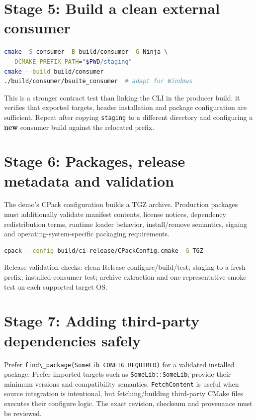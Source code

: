 \documentclass[11pt,letterpaper,oneside]{report}
\providecommand{\passthrough}[1]{#1}
\begin{document}
\chapter{Stage 5: Build a clean external
consumer}\label{stage-5-build-a-clean-external-consumer}

\begin{lstlisting}[language=sh]
cmake -S consumer -B build/consumer -G Ninja \
  -DCMAKE_PREFIX_PATH="$PWD/staging"
cmake --build build/consumer
./build/consumer/bsuite_consumer  # adapt for Windows
\end{lstlisting}

This is a stronger contract test than linking the CLI in the producer
build: it verifies that exported targets, header installation and
package configuration are sufficient. Repeat after copying
\passthrough{\lstinline!staging!} to a different directory and
configuring a \textbf{new} consumer build against the relocated prefix.

\chapter{Stage 6: Packages, release metadata and
validation}\label{stage-6-packages-release-metadata-and-validation}

The demo's CPack configuration builds a TGZ archive. Production packages
must additionally validate manifest contents, license notices,
dependency redistribution terms, runtime loader behavior, install/remove
semantics, signing and operating-system-specific packaging requirements.

\begin{lstlisting}[language=sh]
cpack --config build/ci-release/CPackConfig.cmake -G TGZ
\end{lstlisting}

Release validation checks: clean Release configure/build/test; staging
to a fresh prefix; installed-consumer test; archive extraction and one
representative smoke test on each supported target OS.

\chapter{Stage 7: Adding third-party dependencies
safely}\label{stage-7-adding-third-party-dependencies-safely}

Prefer \passthrough{\lstinline!find\_package(SomeLib CONFIG REQUIRED)!}
for a validated installed package. Prefer imported targets such as
\passthrough{\lstinline!SomeLib::SomeLib!}; provide their minimum
versions and compatibility semantics.
\passthrough{\lstinline!FetchContent!} is useful when source integration
is intentional, but fetching/building third-party CMake files executes
their configure logic. The exact revision, checksum and provenance must
be reviewed.
\end{document}
